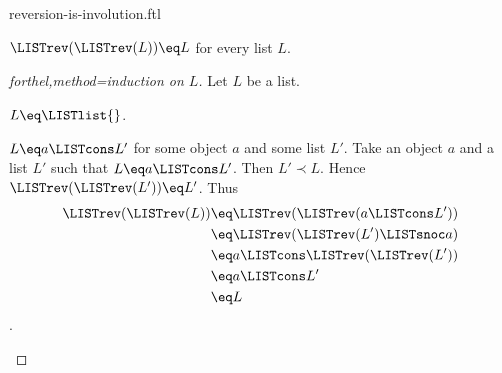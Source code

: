 \documentclass{naproche-library}
\begin{document}
\begin{smodule}[title=Reversion is an Involution]{reversion-is-involution.ftl}

\begin{proposition}[forthel,id=RevIsInvolutionProp]
  $\LISTrev(\LISTrev(L)) \eq L$ for every list $L$.
\end{proposition}
\begin{proof}[forthel,method=induction on $L$]
  Let $L$ be a list.

  \begin{case}{$L \eq \LISTlist{}$.} \end{case}

  \begin{case}{$L \eq a \LISTcons L'$ for some object $a$ and some list $L'$.}
    Take an object $a$ and a list $L'$ such that $L \eq a \LISTcons L'$.
    Then $L' \prec L$.
    Hence $\LISTrev(\LISTrev(L')) \eq L'$.
    Thus
    \begin{align*}
      \LISTrev(\LISTrev(L))
        &\eq \LISTrev(\LISTrev(a \LISTcons L'))\\
        &\eq \LISTrev(\LISTrev(L') \LISTsnoc a)\\
        &\eq a \LISTcons \LISTrev(\LISTrev(L'))\\
        &\eq a \LISTcons L'\\
        &\eq L
    \end{align*}.
  \end{case}
\end{proof}
\end{smodule}
\end{document}

